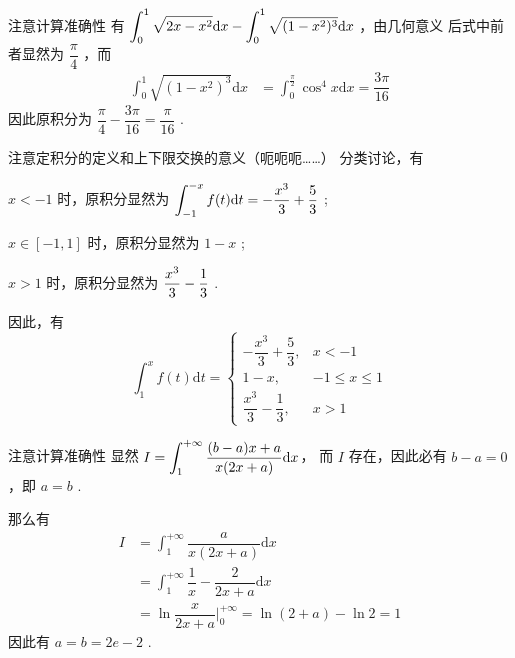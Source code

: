 \begin{answer}[660T60]{注意计算准确性}
    有 $ \displaystyle \int_0^1\sqrt{2x-x^2}\mathrm{d}x-\int_0^1\sqrt{(1-x^2)^3}\mathrm{d}x$ ，由几何意义
    后式中前者显然为 $ \dfrac{\pi}{4} $ ，而\begin{equation*}
        \begin{aligned}
            \int_0^1\sqrt{(1-x^2)^3}\mathrm{d}x &= \int_0^{\frac{\pi}{2}}\cos^4 x\mathrm{d}x = \dfrac{3\pi}{16}
        \end{aligned}
    \end{equation*}
    因此原积分为 $ \dfrac{\pi}{4} - \dfrac{3\pi}{16} = \dfrac{\pi}{16} $ .
\end{answer}

\begin{answer}[660T64]{注意定积分的定义和上下限交换的意义（呃呃呃……）}
    分类讨论，有
    \begin{BulletItemize}
        \item $ x < -1 $ 时，原积分显然为 $ \displaystyle \int_{-1}^{-x} f(t)\mathrm{d}t = -\dfrac{x^3}{3} + \dfrac{5}{3} $ ;
        \item $ x \in [-1,1] $ 时，原积分显然为 $ 1 - x $ ;
        \item $ x > 1 $ 时，原积分显然为 $ \displaystyle \dfrac{x^3}{3} - \dfrac{1}{3} $ .
    \end{BulletItemize}
    因此，有$$
        \int_1^x f(t)\mathrm{d}t = \begin{cases}
            -\dfrac{x^3}{3} + \dfrac{5}{3}, & x < -1 \\ 
            1 - x, & -1 \leq x\leq 1\\ 
            \dfrac{x^3}{3} - \dfrac{1}{3}, & x > 1
        \end{cases}
    $$ 
\end{answer}

\begin{answer}[660T68]{注意计算准确性}
    显然 $\displaystyle I = \int_1^{+\infty} \dfrac{(b-a)x + a}{x(2x+a)}\mathrm{d}x$，
    而 $ I $ 存在，因此必有 $ b - a = 0 $，即 $ a = b $ .

    那么有\begin{equation*}
        \begin{aligned}
            I &= \int_1^{+\infty} \dfrac{a}{x(2x+a)}\mathrm{d}x \\&=
            \int_1^{+\infty} \dfrac{1}{x} - \dfrac{2}{2x+a} \mathrm{d}x\\&=
            \ln \dfrac{x}{2x+a}\Big|^{+\infty}_0 = \ln(2+a) - \ln 2 = 1
        \end{aligned}
    \end{equation*} 
    因此有 $ a = b = 2e-2 $ .
\end{answer}


